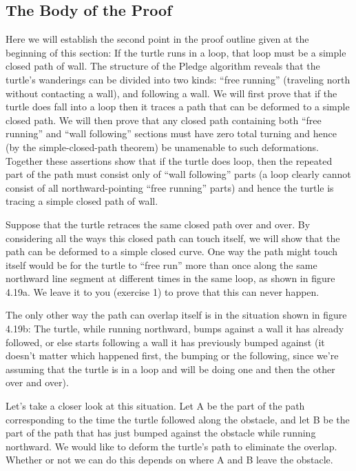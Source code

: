 \documentclass{book}
\begin{document}
\subsection{The Body of the Proof}

Here we will establish the second point in the proof outline given at the
beginning of this section: If the turtle runs in a loop, that loop must
be a simple closed path of wall. The structure of the Pledge algorithm
reveals that the turtle's wanderings can be divided into two kinds: ``free
running'' (traveling north without contacting a wall), and following a
wall. We will first prove that if the turtle does fall into a loop then it
traces a path that can be deformed to a simple closed path. We will
then prove that any closed path containing both ``free running'' and
``wall following'' sections must have zero total turning and hence (by
the simple-closed-path theorem) be unamenable to such deformations.
Together these assertions show that if the turtle does loop, then the
repeated part of the path must consist only of ``wall following'' parts
(a loop clearly cannot consist of all northward-pointing ``free running''
parts) and hence the turtle is tracing a simple closed path of wall.

Suppose that the turtle retraces the same closed path over and over.
By considering all the ways this closed path can touch itself, we will
show that the path can be deformed to a simple closed curve. One way
the path might touch itself would be for the turtle to ``free run'' more
than once along the same northward line segment at different times in
the same loop, as shown in figure 4.19a. We leave it to you (exercise 1)
to prove that this can never happen.

The only other way the path can overlap itself is in the situation
shown in figure 4.19b: The turtle, while running northward, bumps
against a wall it has already followed, or else starts following a wall it
has previously bumped against (it doesn't matter which happened first,
the bumping or the following, since we're assuming that the turtle is in
a loop and will be doing one and then the other over and over).

Let's take a closer look at this situation. Let A be the part of the path
corresponding to the time the turtle followed along the obstacle, and let
B be the part of the path that has just bumped against the obstacle
while running northward. We would like to deform the turtle's path to
eliminate the overlap. Whether or not we can do this depends on where
A and B leave the obstacle.
\end{document}
